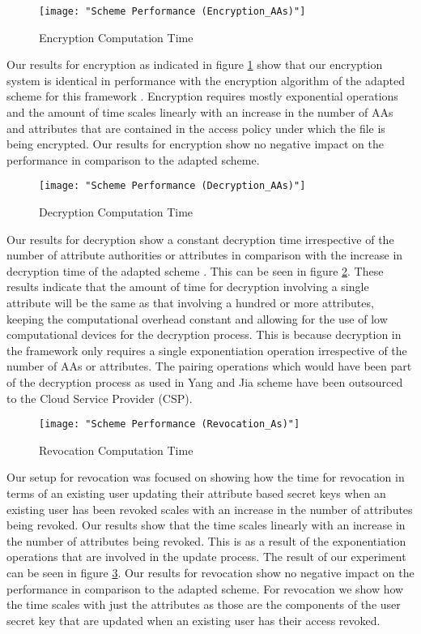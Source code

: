 \begin{figure}[]
	\centering
	\texttt{[image: "Scheme Performance (Encryption\_AAs)"]}
	\caption{Encryption Computation Time}
	\label{fig:res_enc_aas}
\end{figure}

Our results for encryption as indicated in figure \ref{fig:res_enc_aas} show that our encryption system is identical in performance with the encryption algorithm of the adapted scheme for this framework \cite{Yang2014}. Encryption requires mostly exponential operations and the amount of time scales linearly with an increase in the number of AAs and attributes that are contained in the access policy under which the file is being encrypted. Our results for encryption show no negative impact on the performance in comparison to the adapted scheme.

\begin{figure}[]
	\centering
	\texttt{[image: "Scheme Performance (Decryption\_AAs)"]}
	\caption{Decryption Computation Time}
	\label{fig:res_dec_aas}
\end{figure}

Our results for decryption show a constant decryption time irrespective of the number of attribute authorities or attributes in comparison with the increase in decryption time of the adapted scheme \cite{Yang2014}. This can be seen in figure \ref{fig:res_dec_aas}. These results indicate that the amount of time for decryption involving a single attribute will be the same as that involving a hundred or more attributes, keeping the computational overhead constant and allowing for the use of low computational devices for the decryption process. This is because decryption in the framework only requires a single exponentiation operation irrespective of the number of AAs or attributes. The pairing operations which would have been part of the decryption process as used in Yang and Jia scheme \cite{Yang2014} have been outsourced to the Cloud Service Provider (CSP).

\begin{figure}[]
	\centering
	\texttt{[image: "Scheme Performance (Revocation\_As)"]}
	\caption{Revocation Computation Time}
	\label{fig:res_rev_as}
\end{figure}

Our setup for revocation was focused on showing how the time for revocation in terms of an existing user updating their attribute based secret keys when an existing user has been revoked scales with an increase in the number of attributes being revoked. Our results show that the time scales linearly with an increase in the number of attributes being revoked. This is as a result of the exponentiation operations that are involved in the update process. The result of our experiment can be seen in figure \ref{fig:res_rev_as}. Our results for revocation show no negative impact on the performance in comparison to the adapted scheme. For revocation we show how the time scales with just the attributes as those are the components of the user secret key that are updated when an existing user has their access revoked.

